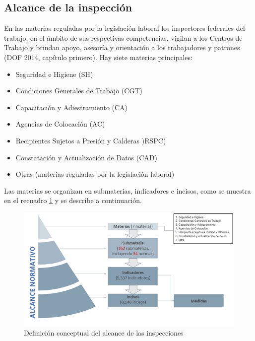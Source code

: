 \documentclass[
]{article}
\providecommand{\tightlist}{%
  \setlength{\itemsep}{0pt}\setlength{\parskip}{0pt}}
\begin{document}
\hypertarget{alcance-de-la-inspecciuxf3n}{%
\subsection{Alcance de la inspección}\label{alcance-de-la-inspecciuxf3n}}

En las materias reguladas por la legislación laboral los inspectores federales del trabajo, en el ámbito de sus respectivas competencias, vigilan a los Centros de Trabajo y brindan apoyo, asesoría y orientación a los trabajadores y patrones (DOF 2014, capítulo primero). Hay siete materias principales:

\begin{itemize}
\tightlist
\item
  Seguridad e Higiene (SH)
\item
  Condiciones Generales de Trabajo (CGT)
\item
  Capacitación y Adiestramiento (CA)
\item
  Agencias de Colocación (AC)
\item
  Recipientes Sujetos a Presión y Calderas )RSPC)
\item
  Constatación y Actualización de Datos (CAD)
\item
  Otras (materias reguladas por la legislación laboral)
\end{itemize}

Las materias se organizan en submaterias, indicadores e incisos, como se muestra en el recuadro \ref{fig:marconormativo} y se describe a continuación.

\begin{figure}
\includegraphics[width=8.36in]{images-1/08/marconormativo} \caption{Definición conceptual del alcance de las inspecciones}\label{fig:marconormativo}
\end{figure}
\end{document}
